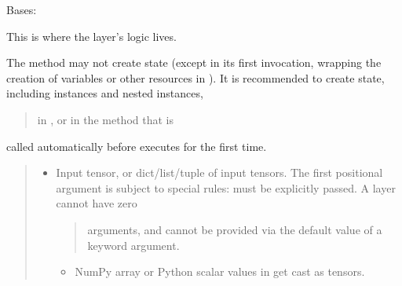 \documentclass[letterpaper,10pt,english]{sphinxmanual}
\begin{document}
\begin{fulllineitems}
\label{\detokenize{index:TRAPT.DLFS.CustomSigmoid}}
\pysigstartsignatures
{}
\pysigstopsignatures
\sphinxAtStartPar
Bases: 

\begin{fulllineitems}
\label{\detokenize{index:TRAPT.DLFS.CustomSigmoid.call}}
\pysigstartsignatures
{}
\pysigstopsignatures
\sphinxAtStartPar
This is where the layer’s logic lives.

\sphinxAtStartPar
The  method may not create state (except in its first
invocation, wrapping the creation of variables or other resources in
).  It is recommended to create state, including
 instances and nested  instances,
\begin{quote}

\sphinxAtStartPar
in , or in the  method that is
\end{quote}

\sphinxAtStartPar
called automatically before  executes for the first time.
\begin{quote}\begin{description}
\begin{itemize}
\item {} 
\sphinxAtStartPar
{} \textendash{} 
\sphinxAtStartPar
Input tensor, or dict/list/tuple of input tensors.
The first positional  argument is subject to special rules:
\sphinxhyphen{}  must be explicitly passed. A layer cannot have zero
\begin{quote}

\sphinxAtStartPar
arguments, and  cannot be provided via the default value
of a keyword argument.
\end{quote}
\begin{itemize}
\item {} 
\sphinxAtStartPar
NumPy array or Python scalar values in  get cast as
tensors.


\end{itemize}
\end{itemize}
\end{description}
\end{quote}
\end{fulllineitems}
\end{fulllineitems}
\end{document}
